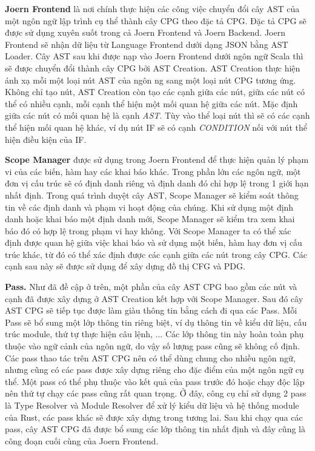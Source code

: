 \textbf{Joern Frontend} là nơi chính thực hiện các công việc chuyển đổi cây AST của một ngôn ngữ lập trình cụ thể thành cây CPG theo đặc tả CPG. Đặc tả CPG sẽ được sử dụng xuyên suốt trong cả Joern Frontend và Joern Backend.
Joern Frontend sẽ nhận dữ liệu từ Language Frontend dưới dạng JSON bằng AST Loader. Cây AST sau khi được nạp vào Joern Frontend dưới ngôn ngữ Scala thì sẽ được chuyển đổi thành cây CPG bởi AST Creation. AST Creation thực hiện ánh xạ mỗi một loại nút AST của ngôn ng
sang một loại nút CPG tương ứng. Không chỉ tạo nút, AST Creation còn tạo các cạnh giữa các nút, giữa các nút có thể có nhiều cạnh, mỗi cạnh thể hiện một mối quan hệ giữa các nút. Mặc định giữa các nút có mối quan hệ là cạnh \textit{AST}. Tùy vào thể loại nút thì sẽ có các cạnh thể hiện mối quan hệ khác, ví dụ nút IF sẽ có cạnh \textit{CONDITION} nối với nút thể hiện điều kiện của IF.

\textbf{Scope Manager} được sử dụng trong Joern Frontend để thực hiện quản lý phạm vi của các biến, hàm hay các khai báo khác. Trong phần lớn các ngôn ngữ, một đơn vị cấu trúc sẽ có định danh riêng và định danh đó chỉ hợp lệ trong 1 giới hạn nhất định. Trong quá trình duyệt cây AST, Scope Manager sẽ kiểm soát thông tin về các định danh và phạm vi hoạt động của chúng. Khi sử dụng một định danh hoặc khai báo một định danh mới, Scope Manager sẽ kiểm tra xem khai báo đó có hợp lệ trong phạm vi hay không. Với Scope Manager ta có thể xác định được quan hệ giữa việc khai báo và sử dụng một biến, hàm hay đơn vị cấu trúc khác, từ đó có thể xác định được các cạnh giữa các nút trong cây CPG. Các cạnh sau này sẽ được sử dụng để xây dựng đồ thị CFG và PDG.

\textbf{Pass.} Như đã đề cập ở trên, một phần của cây AST CPG bao gồm các nút và cạnh đã được xây dựng ở AST Creation kết hợp với Scope Manager. Sau đó cây AST CPG sẽ tiếp tục được làm giàu thông tin bằng cách đi qua các Pass. Mỗi Pass sẽ bổ sung một lớp thông tin riêng biệt, ví dụ thông tin về kiểu dữ liệu, cấu trúc module, thứ tự thực hiện câu lệnh, ... Các lớp thông tin này hoàn toàn phụ thuộc vào ngữ cảnh của ngôn ngữ, do vậy số lượng pass cũng sẽ không cố định. Các pass thao tác trên AST CPG nên có thể dùng chung cho nhiều ngôn ngữ, nhưng cũng có các pass được xây dựng riêng cho đặc điểm của một ngôn ngữ cụ thể. Một pass có thể phụ thuộc vào kết quả của pass trước đó hoặc chạy độc lập nên thứ tự chạy các pass cũng rất quan trọng. Ở đây, công cụ chỉ sử dụng 2 pass là Type Resolver và Module Resolver để xử lý kiểu dữ liệu và hệ thống module của Rust, các pass khác sẽ được xây dựng trong tương lai. Sau khi chạy qua các pass, cây AST CPG đã được bổ sung các lớp thông tin nhất định và đây cũng là công đoạn cuối cùng của Joern Frontend.

